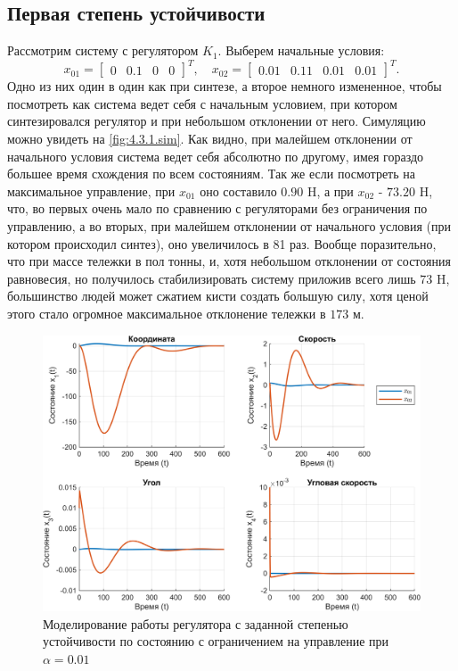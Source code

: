\subsection{Первая степень устойчивости}

Рассмотрим систему с регулятором $K_1$. Выберем начальные условия:
\begin{equation*}
    x_{01}=\begin{bmatrix}
        0&0.1&0&0
    \end{bmatrix}^T,\quad
    x_{02}=\begin{bmatrix}
        0.01&0.11&0.01&0.01
    \end{bmatrix}^T.
\end{equation*}
Одно из них один в один как при синтезе, а второе немного измененное, чтобы
посмотреть как система ведет себя с начальным условием, при котором синтезировался
регулятор и при небольшом отклонении от него.
Симуляцию можно увидеть на \autoref{fig:4.3.1.sim}. Как видно, 
при малейшем отклонении от начального условия система ведет себя
абсолютно по другому, имея гораздо большее время схождения по всем состояниям.
Так же если посмотреть на максимальное управление, при $x_{01}$ оно составило
$0.90$ H, а при $x_{02}$ - $73.20$ H, что, во первых очень мало по сравнению с
регуляторами без ограничения по управлению, а во вторых, при малейшем отклонении
от начального условия (при котором происходил синтез), оно увеличилось в 81 раз.
Вообще поразительно, что при массе тележки в пол тонны, и, хотя небольшом отклонении
от состояния равновесия, но получилось стабилизировать систему приложив всего лишь
$73$ H, большинство людей может сжатием кисти создать большую силу, хотя ценой
этого стало огромное максимальное отклонение тележки в $173$ м.

\begin{figure}[H]
    \centering
    \includegraphics[width=\linewidth]{figs/4.3.1.sim.png}
    \caption{Моделирование работы регулятора с заданной степенью устойчивости
    по состоянию с ограничением на управление при $\alpha=0.01$}
    \label{fig:4.3.1.sim}
\end{figure}

